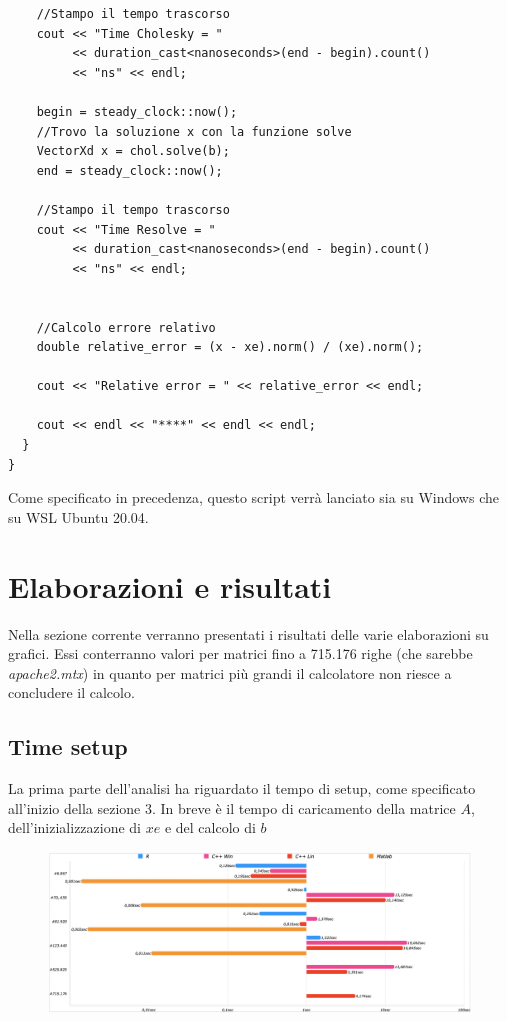 \documentclass[preprint,12pt]{elsarticle}
\begin{document}
\begin{verbatim}
    //Stampo il tempo trascorso
    cout << "Time Cholesky = " 
         << duration_cast<nanoseconds>(end - begin).count()
         << "ns" << endl;
         
    begin = steady_clock::now();
    //Trovo la soluzione x con la funzione solve
    VectorXd x = chol.solve(b);
    end = steady_clock::now();

    //Stampo il tempo trascorso
    cout << "Time Resolve = " 
         << duration_cast<nanoseconds>(end - begin).count() 
         << "ns" << endl;


    //Calcolo errore relativo
    double relative_error = (x - xe).norm() / (xe).norm();

    cout << "Relative error = " << relative_error << endl;

    cout << endl << "****" << endl << endl;
  }
}
\end{verbatim}

Come specificato in precedenza, questo script verrà lanciato sia su Windows che su WSL Ubuntu 20.04.

\newpage

\section{Elaborazioni e risultati}

Nella sezione corrente verranno presentati i risultati delle varie elaborazioni su grafici. Essi conterranno valori per matrici fino a 715.176 righe (che sarebbe \textit{apache2.mtx}) in quanto per matrici più grandi il calcolatore non riesce a concludere il calcolo.

\subsection{Time setup}
La prima parte dell'analisi ha riguardato il tempo di setup, come specificato all'inizio della sezione 3.
In breve è il tempo di caricamento della matrice $A$, dell'inizializzazione di $xe$ e del calcolo di $b$

\begin{figure}[H]
	\centering
	\includegraphics[width=\linewidth]{setup1}
\end{figure}
\end{document}
